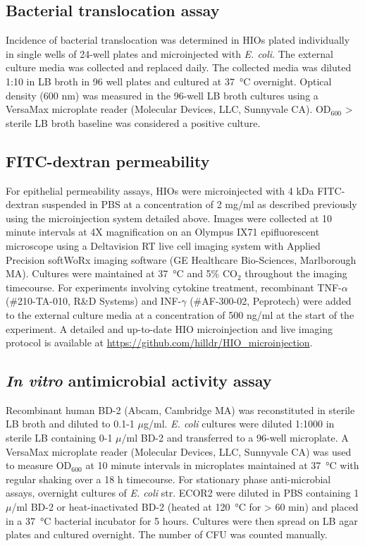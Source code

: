 \documentclass[9pt,lineo]{elife}
\begin{document}
\subsection*{{\bfseries\sffamily } Bacterial translocation assay}
\label{sec:orgheadline21}
Incidence of bacterial translocation was determined in HIOs plated individually in single wells of 24-well plates and microinjected with \emph{E. coli}. The external culture media was collected and replaced daily. The collected media was diluted 1:10 in LB broth in 96 well plates and cultured at \SI{37}{\celsius} overnight. Optical density (600 nm) was measured in the 96-well LB broth cultures using a VersaMax microplate reader (Molecular Devices, LLC, Sunnyvale CA). OD\(_{\text{600}}\) > sterile LB broth baseline was considered a positive culture. 
\subsection*{{\bfseries\sffamily } FITC-dextran permeability}
\label{sec:orgheadline22}
For epithelial permeability assays, HIOs were microinjected with 4 kDa FITC-dextran suspended in PBS at a concentration of 2 mg/ml as described previously \citep{Leslie:2015} using the microinjection system detailed above. Images were collected at 10 minute intervals at 4X magnification on an Olympus IX71 epifluorescent microscope using a Deltavision RT live cell imaging system with Applied Precision softWoRx imaging software (GE Healthcare Bio-Sciences, Marlborough MA). Cultures were maintained at \SI{37}{\celsius} and 5\% CO\(_{\text{2}}\) throughout the imaging timecourse. For experiments involving cytokine treatment, recombinant TNF-\(\alpha\) (\#210-TA-010, R\&D Systems) and INF-\(\gamma\) (\#AF-300-02, Peprotech) were added to the external culture media at a concentration of 500 ng/ml at the start of the experiment. A detailed and up-to-date HIO microinjection and live imaging protocol is available at \url{https://github.com/hilldr/HIO_microinjection}.

\subsection*{{\bfseries\sffamily } \emph{In vitro} antimicrobial activity assay}
\label{sec:orgheadline23}
Recombinant human BD-2 (Abcam, Cambridge MA) was reconstituted in sterile LB broth and diluted to 0.1-1 \(\mu\)g/ml. \emph{E. coli} cultures were diluted 1:1000 in sterile LB containing 0-1 \(\mu\)/ml BD-2 and transferred to a 96-well microplate. A VersaMax microplate reader (Molecular Devices, LLC, Sunnyvale CA) was used to measure OD\(_{\text{600}}\) at 10 minute intervals in microplates maintained at \SI{37}{\celsius} with regular shaking over a 18 h timecourse. For stationary phase anti-microbial assays, overnight cultures of \emph{E. coli} str. ECOR2 were diluted in PBS containing 1 \(\mu\)/ml BD-2 or heat-inactivated BD-2 (heated at \SI{120}{\celsius} for > 60 min) and placed in a \SI{37}{\celsius} bacterial incubator for 5 hours. Cultures were then spread on LB agar plates and cultured overnight. The number of CFU was counted manually.
\end{document}
